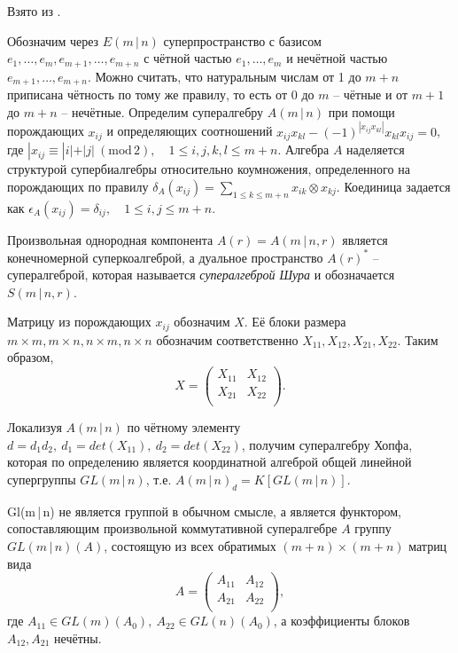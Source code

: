 Взято из \cite{some_properties_supergroups}.

Обозначим через $ E(m\,|\,n) $ суперпространство с базисом $ e_1, \ldots, e_m, e_{m + 1}, \ldots, e_{m + n} $ 
с чётной частью $ e_1, \ldots, e_m $ и нечётной частью $ e_{m + 1}, \ldots, e_{m + n} $. 
Можно считать, что натуральным числам от 1 до $m + n$ приписана чётность по тому же правилу, то есть от 0 до $m$ -- чётные и от $m + 1$ до $m + n$ -- нечётные.
Определим супералгебру $ A(m\,|\,n) $ при помощи порождающих $x_{ij}$ и определяющих соотношений $x_{ij} x_{kl} - (-1)^{|x_{ij} x_{kl}|} x_{kl} x_{ij} = 0 $, 
где $ |x_{ij} \equiv |i| + |j| ~(\mbox{mod}\,2), \quad 1 \leqslant i, j, k, l \leqslant m + n $. 
Алгебра $A$ наделяется структурой супербиалгебры относительно коумножения, определенного на порождающих по правилу 
$ \delta_A (x_{ij}) = \sum\limits_{1 \leqslant k \leqslant m + n} x_{ik} \otimes x_{kj} $. 
Коединица задается как $ \epsilon_A (x_{ij}) = \delta_{ij}, \quad 1 \leqslant i, j \leqslant m + n $. 

Произвольная однородная компонента $ A(r) = A(m\,|\,n, r) $ является конечномерной суперкоалгеброй, а дуальное пространство $ A(r)^* $ -- супералгеброй, 
которая называется \textit{супералгеброй Шура} и обозначается $ S(m\,|\,n, r) $.

Матрицу из порождающих $x_{ij}$ обозначим $X$. Её блоки размера $ m \times m, m \times n, n \times m, n \times n $ обозначим соответственно 
$ X_{11}, X_{12}, X_{21}, X_{22} $. Таким образом,
$$ X = 
\begin{pmatrix}
X_{11} & X_{12} \\
X_{21} & X_{22} \\
\end{pmatrix}.
$$

Локализуя $ A(m\,|\,n) $ по чётному элементу $ d = d_1 d_2, \: d_1 = det(X_{11}), \: d_2 = det(X_{22}) $, получим супералгебру Хопфа, 
которая по определению является координатной алгеброй общей линейной супергруппы $ GL(m\,|\,n) $, т.е. $ A(m\,|\,n)_d = K[GL(m\,|\,n)] $.

Gl(m\,|\,n) не является группой в обычном смысле, а является функтором, сопоставляющим произвольной коммутативной супералгебре $A$
группу $ GL(m\,|\,n)(A) $, состоящую из всех обратимых $ (m + n) \times (m + n) $ матриц вида
$$ A = 
\begin{pmatrix}
A_{11} & A_{12} \\
A_{21} & A_{22} \\
\end{pmatrix},
$$
где $ A_{11} \in GL(m)(A_0), \: A_{22} \in GL(n)(A_0)$, а коэффициенты блоков $ A_{12}, A_{21} $ нечётны. 

